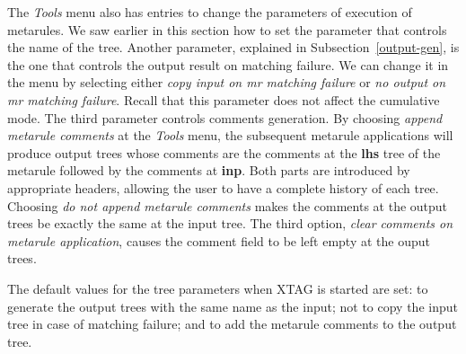  
The {\it Tools} menu also has entries to change the parameters of execution of 
metarules. We saw earlier in this section how to set the parameter that 
controls the name of the tree. Another parameter, explained in 
Subsection~\ref{output-gen}, is the one that controls the output result on 
matching failure. We can change it in the menu by selecting either {\it copy input on mr matching failure} or {\it no output on mr matching failure}. Recall 
that this parameter does not affect the cumulative mode.  The third parameter 
controls comments generation. By choosing {\it append metarule comments} at 
the {\it Tools} menu, the subsequent metarule applications will produce output 
trees whose comments are the comments at the {\bf lhs} tree of the metarule 
followed by the comments at {\bf inp}. Both parts are introduced by appropriate 
headers, allowing the user to have a complete history of each tree. Choosing 
{\it do not append metarule comments} makes the comments at the output trees 
be exactly the same at the input tree. The third option, {\it clear comments on metarule application}, causes the comment field to be left empty at the ouput 
trees. 
 
The default values for the tree parameters when XTAG is started are set: 
to generate the output trees with the same name as the input; not to copy 
the input tree in case of matching failure; and to add the metarule comments 
to the output tree. 
 
